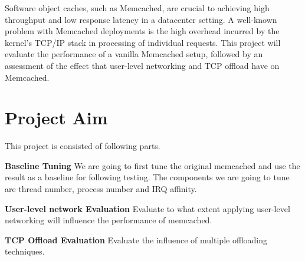 \documentclass[bsc,frontabs,twoside,singlespacing,parskip,deptreport]{infthesis}     %
\begin{document}
Software object caches, such as Memcached, are crucial to achieving high throughput and low response latency in a datacenter setting. A well-known problem with Memcached deployments is the high overhead incurred by the kernel's TCP/IP stack in processing of individual requests. This project will evaluate the performance of a vanilla Memcached setup, followed by an assessment of the effect that user-level networking and TCP offload have on Memcached. 


\section{Project Aim}

This project is consisted of following parts.

\textbf{Baseline Tuning} We are going to first tune the original memcached and use the result as a baseline for following testing. The components we are going to tune are thread number, process number and IRQ affinity.

\textbf{User-level network Evaluation} Evaluate to what extent applying user-level networking will influence the performance of memcached.

\textbf{TCP Offload Evaluation} Evaluate the influence of multiple offloading techniques.






%
%
%
\end{document}
